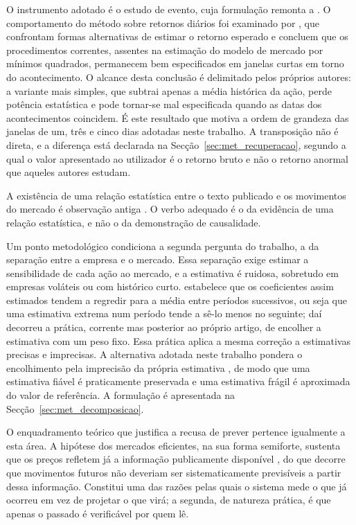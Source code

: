 O instrumento adotado é o estudo de evento, cuja formulação remonta a
\textcite{fama1969adjustment}. O comportamento do método sobre retornos diários foi examinado por
\textcite{brown1985daily}, que confrontam formas alternativas de estimar o retorno esperado e
concluem que os procedimentos correntes, assentes na estimação do modelo de mercado por mínimos
quadrados, permanecem bem especificados em janelas curtas em torno do acontecimento. O alcance
desta conclusão é delimitado pelos próprios autores: a variante mais simples, que subtrai apenas a
média histórica da ação, perde potência estatística e pode tornar-se mal especificada quando as
datas dos acontecimentos coincidem. É este resultado que motiva a ordem de grandeza das
janelas de um, três e cinco dias adotadas neste trabalho. A transposição não é direta, e a diferença
está declarada na
Secção~\ref{sec:met_recuperacao}, segundo a qual o valor apresentado ao utilizador é o retorno bruto
e não o retorno anormal que aqueles autores estudam.

A existência de uma relação estatística entre o texto publicado e os movimentos do mercado é
observação antiga \autocite{tetlock2007media}. O verbo adequado é o da evidência de uma relação
estatística, e não o da demonstração de causalidade.

Um ponto metodológico condiciona a segunda pergunta do trabalho, a da separação entre a empresa e o
mercado. Essa separação exige estimar a sensibilidade de cada ação ao mercado, e a estimativa é
ruidosa, sobretudo em empresas voláteis ou com histórico curto. \textcite{blume1971risk} estabelece
que os coeficientes assim estimados tendem a regredir para a média entre períodos sucessivos, ou
seja que uma estimativa extrema num período tende a sê-lo menos no seguinte; daí decorreu a prática,
corrente mas posterior ao próprio artigo, de encolher a estimativa com um peso fixo. Essa prática
aplica a mesma correção a estimativas precisas e imprecisas. A alternativa adotada neste trabalho
pondera o encolhimento pela imprecisão da própria estimativa \autocite{vasicek1973beta}, de modo que
uma estimativa fiável é praticamente preservada e uma estimativa frágil é aproximada do valor de
referência. A formulação é apresentada na Secção~\ref{sec:met_decomposicao}.

O enquadramento teórico que justifica a recusa de prever pertence igualmente a esta área. A
hipótese dos mercados eficientes, na sua forma semiforte, sustenta que os preços refletem já a
informação publicamente disponível \autocite{fama1970efficient}, do que decorre que movimentos
futuros não deveriam ser sistematicamente previsíveis a partir dessa informação. Constitui uma das
razões pelas quais o sistema mede o que já ocorreu em vez de projetar o que virá; a segunda, de
natureza prática, é que apenas o passado é verificável por quem lê.

